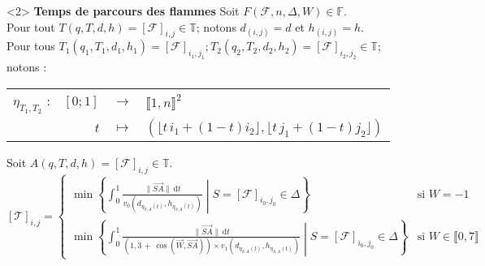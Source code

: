 \documentclass{beamer}
\begin{document}
{    \begin{onlyenv}<2>
      \textbf{Temps de parcours des flammes}
      \bigbreak
      Soit \(F(\mathcal{F},n,\Delta,W) \in \mathbb{F}\).\\
      {\small Pour tout \(T(q,T,d,h) = [\mathcal{F}]_{i,j} \in \mathbb{T}\); notons \(d_{(i,j)} = d\) et \(h_{(i,j)} = h\).}\\
      {\scriptsize Pour tous \(T_{1}(q_{1},T_{1},d_{1},h_{1}) = [\mathcal{F}]_{i_{1},j_{1}}; T_{2}(q_{2},T_{2},d_{2},h_{2}) = [\mathcal{F}]_{i_{2},j_{2}} \in \mathbb{T}\); notons :} \begin{center}\begin{tabular}{c | r c l}
        \(\eta_{T_{1},T_{2}}\) : & \([0;1]\) & \(\to\) & \(\llbracket 1,n \rrbracket ^{2}\)\\
        & \(t\) & \(\mapsto\) & \((\lfloor t\,i_{1}+(1-t)i_{2} \rfloor,\lfloor t\,j_{1}+(1-t)j_{2} \rfloor)\)
      \end{tabular}\end{center}
      Soit \(A(q,T,d,h) = [\mathcal{F}]_{i,j} \in \mathbb{T}\).
      {\tiny\[
        \boxed{[\mathcal{T}]_{i,j} =\begin{cases}
          \min{\left\{ \displaystyle\int_{0}^{1} \frac{\|\overrightarrow{SA}\|\,\mathrm{d}t}{v_{0}(d_{\eta_{S,A}(t)},h_{\eta_{S,A}(t)})} \middle| S = [\mathcal{F}]_{i_{0},j_{0}} \in \Delta \right\}} & \text{si } W = -1\\
          \min{\left\{ \displaystyle\int_{0}^{1} \frac{\|\overrightarrow{SA}\|\,\mathrm{d}t}{(1,3\,+\,\cos(\overrightarrow{W},\overrightarrow{SA})) \times v_{1}(d_{\eta_{S,A}(t)},h_{\eta_{S,A}(t)})} \middle| S = [\mathcal{F}]_{i_{0},j_{0}} \in \Delta \right\}} & \text{si } W \in \llbracket 0,7 \rrbracket
        \end{cases}}
      \]}
    \end{onlyenv}

}
\end{document}
